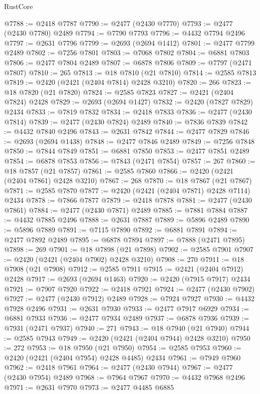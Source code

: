 \begin{lexlean}{RustCore}
\begin{coremodule}
@7788 := @2418 @7787
@7790 := @2477 (@2430 @7770)
@7793 := @2477 (@2430 @7780) @2489
@7794 := @7790 @7793
@7796 := @4432 @7794 @2496
@7797 := @2631 @7796
@7799 := @2693 (@2694 @1412)
@7801 := @2477 @7799 @2489
@7802 := @7256 @7801
@7803 := @7068 @7802
@7804 := @6881 @7803
@7806 := @2477 @7804 @2489
@7807 := @6878 @7806
@7809 := @7797 (@2471 @7807)
@7810 := 265
@7813 := @18 @7810 (@21 @7810)
@7814 := @2585 @7813
@7819 := @2420 (@2421 (@2404 @7814) @2428 @3210)
@7820 := 266
@7823 := @18 @7820 (@21 @7820)
@7824 := @2585 @7823
@7827 := @2421 (@2404 @7824) @2428
@7829 := @2693 (@2694 @1427)
@7832 := @2420 (@7827 @7829) @2434
@7833 := @7819 @7832
@7834 := @2418 @7833
@7836 := @2477 (@2430 @7814)
@7839 := @2477 (@2430 @7824) @2489
@7840 := @7836 @7839
@7842 := @4432 @7840 @2496
@7843 := @2631 @7842
@7844 := @2477 @7829
@7846 := @2693 (@2694 @1438)
@7848 := @2477 @7846 @2489
@7849 := @7256 @7848
@7850 := @7844 @7849
@7851 := @6881 @7850
@7853 := @2477 @7851 @2489
@7854 := @6878 @7853
@7856 := @7843 (@2471 @7854)
@7857 := 267
@7860 := @18 @7857 (@21 @7857)
@7861 := @2585 @7860
@7866 := @2420 (@2421 (@2404 @7861) @2428 @3210)
@7867 := 268
@7870 := @18 @7867 (@21 @7867)
@7871 := @2585 @7870
@7877 := @2420 (@2421 (@2404 @7871) @2428 @7114) @2434
@7878 := @7866 @7877
@7879 := @2418 @7878
@7881 := @2477 (@2430 @7861)
@7884 := @2477 (@2430 @7871) @2489
@7885 := @7881 @7884
@7887 := @4432 @7885 @2496
@7888 := @2631 @7887
@7889 := @5896 @2489
@7890 := @5896 @7889
@7891 := @7115 @7890
@7892 := @6881 @7891
@7894 := @2477 @7892 @2489
@7895 := @6878 @7894
@7897 := @7888 (@2471 @7895)
@7898 := 269
@7901 := @18 @7898 (@21 @7898)
@7902 := @2585 @7901
@7907 := @2420 (@2421 (@2404 @7902) @2428 @3210)
@7908 := 270
@7911 := @18 @7908 (@21 @7908)
@7912 := @2585 @7911
@7915 := @2421 (@2404 @7912) @2428
@7917 := @2693 (@2694 @1463)
@7920 := @2420 (@7915 @7917) @2434
@7921 := @7907 @7920
@7922 := @2418 @7921
@7924 := @2477 (@2430 @7902)
@7927 := @2477 (@2430 @7912) @2489
@7928 := @7924 @7927
@7930 := @4432 @7928 @2496
@7931 := @2631 @7930
@7933 := @2477 @7917 @6929
@7934 := @6881 @7933
@7936 := @2477 @7934 @2489
@7937 := @6878 @7936
@7939 := @7931 (@2471 @7937)
@7940 := 271
@7943 := @18 @7940 (@21 @7940)
@7944 := @2585 @7943
@7949 := @2420 (@2421 (@2404 @7944) @2428 @3210)
@7950 := 272
@7953 := @18 @7950 (@21 @7950)
@7954 := @2585 @7953
@7960 := @2420 (@2421 (@2404 @7954) @2428 @4485) @2434
@7961 := @7949 @7960
@7962 := @2418 @7961
@7964 := @2477 (@2430 @7944)
@7967 := @2477 (@2430 @7954) @2489
@7968 := @7964 @7967
@7970 := @4432 @7968 @2496
@7971 := @2631 @7970
@7973 := @2477 @4485 @6885

\end{coremodule}
\end{lexlean}
